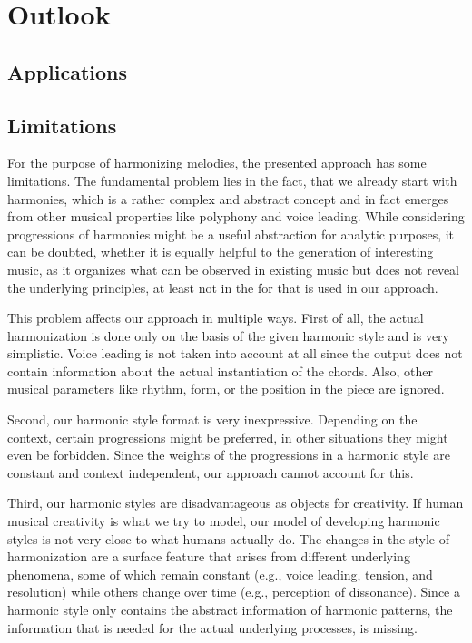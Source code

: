 \section{Outlook}

\subsection{Applications}

\subsection{Limitations}

For the purpose of harmonizing melodies, the presented approach has some limitations.
The fundamental problem lies in the fact, that we already start with harmonies, which is a rather complex and abstract concept and in fact emerges from other musical properties like polyphony and voice leading.
While considering progressions of harmonies might be a useful abstraction for analytic purposes, it can be doubted, whether it is equally helpful to the generation of interesting music, as it organizes what can be observed in existing music but does not reveal the underlying principles, at least not in the for that is used in our approach.

This problem affects our approach in multiple ways.
First of all, the actual harmonization is done only on the basis of the given harmonic style and is very simplistic.
Voice leading is not taken into account at all since the output does not contain information about the actual instantiation of the chords.
Also, other musical parameters like rhythm, form, or the position in the piece are ignored.

Second, our harmonic style format is very inexpressive.
Depending on the context, certain progressions might be preferred, in other situations they might even be forbidden.
Since the weights of the progressions in a harmonic style are constant and context independent, our approach cannot account for this.

Third, our harmonic styles are disadvantageous as objects for creativity.
If human musical creativity is what we try to model, our model of developing harmonic styles is not very close to what humans actually do.
The changes in the style of harmonization are a surface feature that arises from different underlying phenomena, some of which remain constant (e.g., voice leading, tension, and resolution) while others change over time (e.g., perception of dissonance).
Since a harmonic style only contains the abstract information of harmonic patterns, the information that is needed for the actual underlying processes, is missing.

